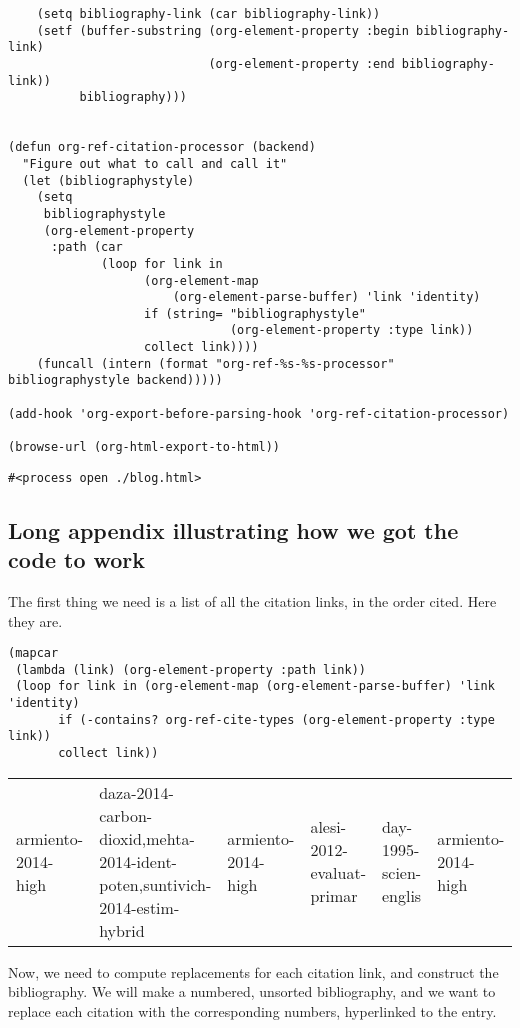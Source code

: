 \documentclass[11pt]{article}
\begin{document}
\begin{verbatim}
    (setq bibliography-link (car bibliography-link))
    (setf (buffer-substring (org-element-property :begin bibliography-link)
                            (org-element-property :end bibliography-link))
          bibliography)))


(defun org-ref-citation-processor (backend)
  "Figure out what to call and call it"
  (let (bibliographystyle)
    (setq
     bibliographystyle
     (org-element-property
      :path (car
             (loop for link in
                   (org-element-map
                       (org-element-parse-buffer) 'link 'identity)
                   if (string= "bibliographystyle"
                               (org-element-property :type link))
                   collect link))))
    (funcall (intern (format "org-ref-%s-%s-processor" bibliographystyle backend)))))

(add-hook 'org-export-before-parsing-hook 'org-ref-citation-processor)

(browse-url (org-html-export-to-html))
\end{verbatim}

\begin{verbatim}
#<process open ./blog.html>
\end{verbatim}


\subsection{Long appendix illustrating how we got the code to work}
\label{sec-1-2}
The first thing we need is a list of all the citation links, in the order cited. Here they are.

\begin{verbatim}
(mapcar
 (lambda (link) (org-element-property :path link))
 (loop for link in (org-element-map (org-element-parse-buffer) 'link 'identity)
       if (-contains? org-ref-cite-types (org-element-property :type link))
       collect link))
\end{verbatim}
\begin{center}
\begin{tabular}{llllll}
armiento-2014-high & daza-2014-carbon-dioxid,mehta-2014-ident-poten,suntivich-2014-estim-hybrid & armiento-2014-high & alesi-2012-evaluat-primar & day-1995-scien-englis & armiento-2014-high\\
\end{tabular}
\end{center}

Now, we need to compute replacements for each citation link, and construct the bibliography. We will make a numbered, unsorted bibliography, and we want to replace each citation with the corresponding numbers, hyperlinked to the entry.
\end{document}
